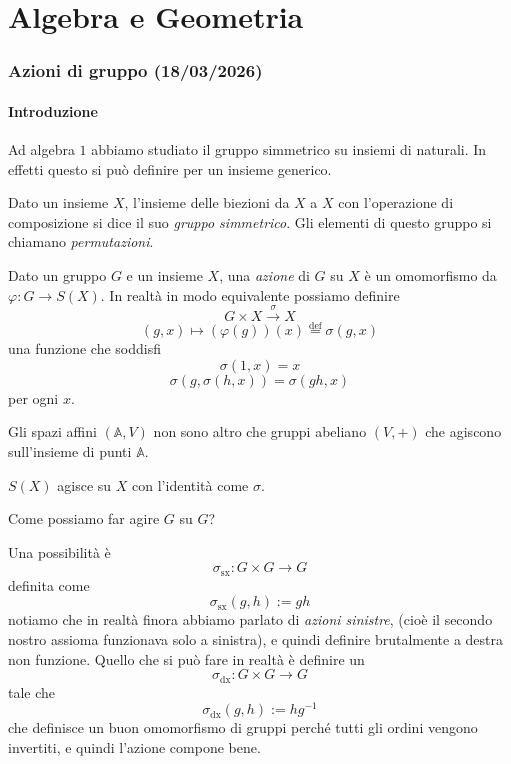 \documentclass[11pt]{scrartcl}
\begin{document}
	\newpage
	
	\part{Algebra e Geometria}
	\section{Azioni di gruppo (18/03/2026)}
	\subsection{Introduzione}
	Ad algebra $1$ abbiamo studiato il gruppo simmetrico su insiemi di naturali. In effetti questo si può definire per un insieme generico.
	\begin{definition}
		Dato un insieme $X$, l'insieme delle biezioni da $X$ a $X$ con l'operazione di composizione si dice il suo \textit{gruppo simmetrico}. Gli elementi di questo gruppo si chiamano \textit{permutazioni}. 
	\end{definition}
	\begin{definition}[Azione]
		Dato un gruppo $G$ e un insieme $X$, una \textit{azione} di $G$ su $X$ è un omomorfismo da $\varphi:G\to S(X)$. In realtà in modo equivalente possiamo definire
		$$G\times X \overset{\sigma}{\to} X$$
		$$(g,x)\mapsto (\varphi(g))(x)\overset{\text{def}}{=}\sigma(g,x)$$
		una funzione che soddisfi
		$$\sigma(1,x)=x$$
		$$\sigma(g,\sigma(h,x))=\sigma(gh,x)$$
		per ogni $x$.
	\end{definition}
	\begin{example}
		Gli spazi affini $(\mathbb{A},V)$ non sono altro che gruppi abeliano $(V,+)$ che agiscono sull'insieme di punti $\mathbb{A}$. 
	\end{example}
	\begin{example}
		$S(X)$ agisce su $X$ con l'identità come $\sigma$.
	\end{example}
	\begin{problem}
		Come possiamo far agire $G$ su $G$?
	\end{problem}
	Una possibilità è
	$$\sigma_{\text{sx}}:G\times G\to G$$
	definita come
	$$\sigma_{\text{sx}}(g,h):=gh$$
	notiamo che in realtà finora abbiamo parlato di \textit{azioni sinistre}, (cioè il secondo nostro assioma funzionava solo a sinistra), e quindi definire brutalmente a destra non funzione. Quello che si può fare in realtà è definire un 
	$$\sigma_{\text{dx}}:G\times G \to G$$
	tale che 
	$$\sigma_{\text{dx}}(g,h):=hg^{-1}$$
	che definisce un buon omomorfismo di gruppi perché tutti gli ordini vengono invertiti, e quindi l'azione compone bene. \\
\end{document}
